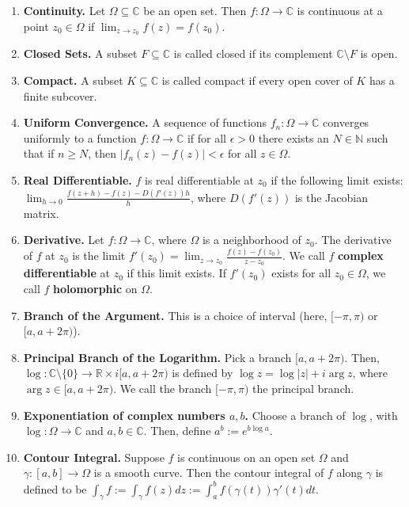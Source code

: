 \documentclass[12pt]{article}
\theoremstyle{definition}
\theoremstyle{named}
\begin{document}
{\begin{multicols}{2}
\begin{spacing}{1.01}
\begin{enumerate}
    \item \textbf{Continuity. } Let $\Omega \subseteq \mathbb{C}$ be an open set. Then $f: \Omega \to \mathbb{C}$ is continuous at a point $z_0 \in \Omega$ if $\lim_{z \to z_0} f(z) = f(z_0)$. 
    \item \textbf{Closed Sets. } A subset $F \subseteq \mathbb{C}$ is called closed if its complement $\mathbb{C} \setminus F$ is open. 
    \item \textbf{Compact. } A subset $K \subseteq \mathbb{C}$ is called compact if every open cover of $K$ has a finite subcover. 
    \item \textbf{Uniform Convergence. } A sequence of functions $f_n: \Omega \to \mathbb{C}$ converges uniformly to a function $f: \Omega \to \mathbb{C}$ if for all $\epsilon > 0$ there exists an $N \in \mathbb{N}$ such that if $n \geq N$, then $|f_n(z) - f(z)| < \epsilon$ for all $z \in \Omega$. 
    \item \textbf{Real Differentiable. } $f$ is real differentiable at $z_0$ if the following limit exists: $\lim_{h \to 0} \frac{f(z+h) - f(z) - D(f'(z))h}{h}$, where $D(f'(z))$ is the Jacobian matrix. 
    \item \textbf{Derivative. } Let $f: \Omega \to \mathbb{C}$, where $\Omega$ is a neighborhood of $z_0$. The derivative of $f$ at $z_0$ is the limit $f'(z_0) = \lim_{z \to z_0} \frac{f(z) - f(z_0)}{z - z_0}$. We call $f$ \textbf{complex differentiable} at $z_0$ if this limit exists. If $f'(z_0)$ exists for all $z_0 \in \Omega$, we call $f$ \textbf{holomorphic} on $\Omega$. 
    \item \textbf{Branch of the Argument. } This is a choice of interval (here, $[-\pi,\pi)$ or $[a,a+2\pi)$). 
    \item \textbf{Principal Branch of the Logarithm. } Pick a branch $[a, a+2\pi)$. Then, $\log: \mathbb{C} \setminus \{0\} \to \mathbb{R} \times i[a,a+2\pi)$ is defined by $\log z = \log |z| + i\arg z$, where $\arg z \in [a, a+2\pi)$. We call the branch $[-\pi,\pi)$ the principal branch. 
    \item \textbf{Exponentiation of complex numbers $a,b$. } Choose a branch of $\log$, with $\log: \Omega \to \mathbb{C}$ and $a,b \in \mathbb{C}$. Then, define $a^b := e^{b\log a}$. 
    \item \textbf{Contour Integral. } Suppose $f$ is continuous on an open set $\Omega$ and $\gamma: [a,b] \to \Omega$ is a smooth curve. Then the contour integral of $f$ along $\gamma$ is defined to be $\int_{\gamma} f := \int_{\gamma} f(z) dz := \int_{a}^{b}f(\gamma(t))\gamma'(t) dt$. 

\end{enumerate}
\end{spacing}
\end{multicols}}
\end{document}
